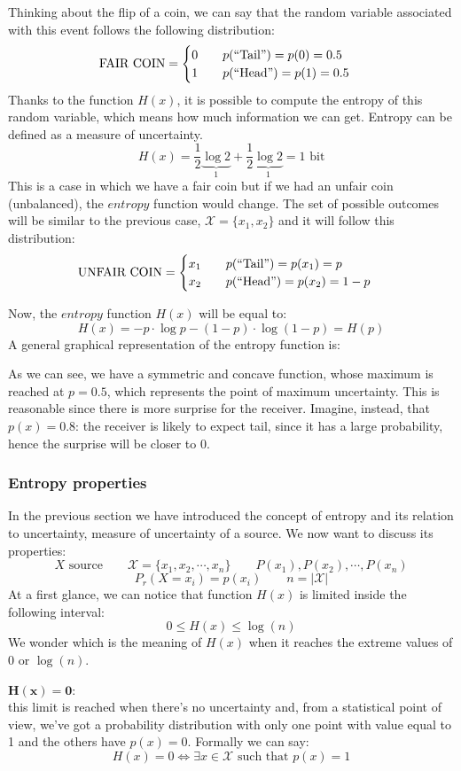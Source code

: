 \begin{exmp} Thinking about the flip of a coin, we can say that the random variable associated with this event follows the following distribution:
$$
\text{FAIR COIN} =
\begin{cases}
0 \qquad p(``\text{Tail}") = p(0) = 0.5\\
1 \qquad p(``\text{Head}") = p(1) = 0.5
\end{cases}
$$
Thanks to the function $H(x)$, it is possible to compute the entropy of this random variable, which means how much information we can get. Entropy can be defined as a measure of uncertainty.
$$H(x) = \frac{1}{2} \underbrace{\log 2}_{1} + \frac{1}{2} \underbrace{\log 2}_{1} = 1 \text{ bit}$$
This is a case in which we have a fair coin but if we had an unfair coin (unbalanced), the $entropy$ function would change. The set of possible outcomes will be similar to the previous case, $\mathcal{X} = \{x_1, x_2\}$ and it will follow this distribution:
$$
\text{UNFAIR COIN} =
\begin{cases}
x_1 \qquad p(``\text{Tail}") = p(x_1) = p\\
x_2 \qquad p(``\text{Head}") = p(x_2) = 1-p
\end{cases}
$$
\end{exmp}
\par \bigskip \noindent
Now, the $entropy$ function $H(x)$ will be equal to:
$$H(x) = -p \cdot \log p - (1-p) \cdot \log (1-p) = H(p)$$
A general graphical representation of the entropy function is:


As we can see, we have a symmetric and concave function, whose maximum is reached at $p = 0.5$, which represents the point of maximum uncertainty. This is reasonable since there is more surprise for the receiver. Imagine, instead, that $p(x) = 0.8$: the receiver is likely to expect tail, since it has a large probability, hence the surprise will be closer to $0$.

\subsubsection{Entropy properties}
In the previous section we have introduced the concept of entropy and its relation to uncertainty, measure of uncertainty of a source. We now want to discuss its properties:
$$X \text{ source} \qquad \mathcal{X} = \{x_1, x_2, \cdots, x_n\} \qquad P(x_1), P(x_2),\cdots, P(x_n) $$
$$P_r(X = x_i) = p(x_i) \qquad n = |\mathcal{X}|$$
At a first glance, we can notice that function $H(x)$ is limited inside the following interval:
$$0 \leq H(x) \leq \log(n)$$
We wonder which is the meaning of $H(x)$ when it reaches the extreme values of $0$ or $\log(n)$.
\par \bigskip \noindent
$\mathbf{H(x) = 0}$:\\
this limit is reached when there's no uncertainty and, from a statistical point of view, we've got a probability distribution with only one point with value equal to 1 and the others have $p(x) = 0$. Formally we can say:
$$H(x) = 0 \iff \exists x \in \mathcal{X} \text{ such that } p(x)=1$$

